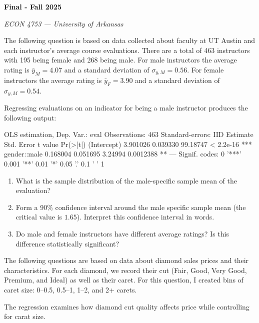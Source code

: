 \documentclass[12pt]{article}
\begin{document}
\begin{center}
  {\Huge\bf Final - Fall 2025}
  
  \smallskip
  {\large\it ECON 4753 — University of Arkansas}
\end{center}

\vspace{5mm}
The following question is based on data collected about faculty at UT Austin and each instructor's average course evaluations. 
There are a total of 463 instructors with 195 being female and 268 being male.
For male instructors the average rating is $\bar{y}_M = 4.07$ and a standard deviation of $\sigma_{y, M} = 0.56$.
For female instructors the average rating is  $\bar{y}_F = 3.90$ and a standard deviation of $\sigma_{y, M} = 0.54$.

Regressing evaluations on an indicator for being a male instructor produces the following output:

  \begin{smallcodeblock}[{}]
OLS estimation, Dep. Var.: eval
Observations: 463
Standard-errors: IID 
             Estimate Std. Error  t value  Pr(>|t|)    
(Intercept)  3.901026   0.039330 99.18747 < 2.2e-16 ***
gender::male 0.168004   0.051695  3.24994 0.0012388 ** 
---
Signif. codes:  0 '***' 0.001 '**' 0.01 '*' 0.05 '.' 0.1 ' ' 1
  \end{smallcodeblock}

\begin{enumerate}
  \item What is the sample distribution of the male-specific sample mean of the evaluation?
  
  \item Form a 90\% confidence interval around the male specific sample mean (the critical value is $1.65$). Interpret this confidence interval in words.
  
  \item Do male and female instructors have different average ratings? Is this difference statistically significant?
\end{enumerate}

\newpage
The following questions are based on data about diamond sales prices and their characteristics. 
For each diamond, we record their cut (Fair, Good, Very Good, Premium, and Ideal) as well as their caret.
For this question, I created bins of caret size: 0--0.5, 0.5--1, 1--2, and 2+ carets.

The regression examines how diamond cut quality affects price while controlling for carat size.
\end{document}
